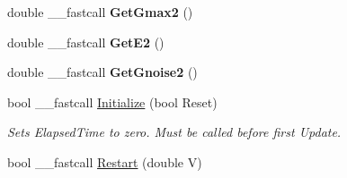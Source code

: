 \begin{DoxyCompactItemize}
\item 
\hypertarget{class_t_h_h2_current_ada91730aaaba2b29f580b63ad9b3f240}{double \+\_\+\+\_\+fastcall {\bfseries Get\+Gmax2} ()}\label{class_t_h_h2_current_ada91730aaaba2b29f580b63ad9b3f240}

\item 
\hypertarget{class_t_h_h2_current_ac81e5689edff3393a71cb3e8d0e19e5f}{double \+\_\+\+\_\+fastcall {\bfseries Get\+E2} ()}\label{class_t_h_h2_current_ac81e5689edff3393a71cb3e8d0e19e5f}

\item 
\hypertarget{class_t_h_h2_current_a3eb1393b370fcdb629ca74f6b60d63c7}{double \+\_\+\+\_\+fastcall {\bfseries Get\+Gnoise2} ()}\label{class_t_h_h2_current_a3eb1393b370fcdb629ca74f6b60d63c7}

\item 
bool \+\_\+\+\_\+fastcall \hyperlink{class_t_h_h2_current_aec9a01bd50e5695d3ab16c58e4c4b2a5}{Initialize} (bool Reset)
\begin{DoxyCompactList}\small\item\em Sets Elapsed\+Time to zero. Must be called before first Update. \end{DoxyCompactList}\item 
\hypertarget{class_t_h_h2_current_a8f50ae84c43b83df25bcd203fbe3ebdd}{bool \+\_\+\+\_\+fastcall \hyperlink{class_t_h_h2_current_a8f50ae84c43b83df25bcd203fbe3ebdd}{Restart} (double V)}\label{class_t_h_h2_current_a8f50ae84c43b83df25bcd203fbe3ebdd}


\end{DoxyCompactItemize}
